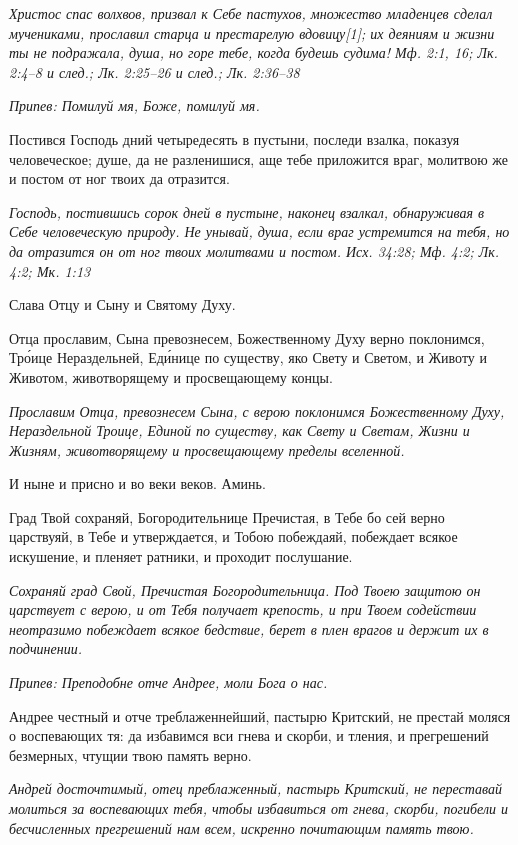 \itshape Христос спас волхвов, призвал к Себе пастухов, множество младенцев сделал мучениками, прославил старца и престарелую вдовицу[1]; их деяниям и жизни ты не подражала, душа, но горе тебе, когда будешь судима! Мф. 2:1, 16; Лк. 2:4–8 и след.; Лк. 2:25–26 и след.; Лк. 2:36–38\normalfont{}


\itshape Припев:\normalfont{} Помилуй мя, Боже, помилуй мя.


Постився Господь дний четыредесять в пустыни, последи взалка, показуя человеческое; душе, да не разленишися, аще тебе приложится враг, молитвою же и постом от ног твоих да отразится.


\itshape Господь, постившись сорок дней в пустыне, наконец взалкал, обнаруживая в Себе человеческую природу. Не унывай, душа, если враг устремится на тебя, но да отразится он от ног твоих молитвами и постом. Исх. 34:28; Мф. 4:2; Лк. 4:2; Мк. 1:13\normalfont{}


Слава Отцу и Сыну и Святому Духу.


Отца прославим, Сына превознесем, Божественному Духу верно поклонимся, Тро́ице Нераздельней, Еди́нице по существу, яко Свету и Светом, и Животу и Животом, животворящему и просвещающему концы.


\itshape Прославим Отца, превознесем Сына, с верою поклонимся Божественному Духу, Нераздельной Троице, Единой по существу, как Свету и Светам, Жизни и Жизням, животворящему и просвещающему пределы вселенной.\normalfont{}


И ныне и присно и во веки веков. Аминь.


Град Твой сохраняй, Богородительнице Пречистая, в Тебе бо сей верно царствуяй, в Тебе и утверждается, и Тобою побеждаяй, побеждает всякое искушение, и пленяет ратники, и проходит послушание.


\itshape Сохраняй град Свой, Пречистая Богородительница. Под Твоею защитою он царствует с верою, и от Тебя получает крепость, и при Твоем содействии неотразимо побеждает всякое бедствие, берет в плен врагов и держит их в подчинении.\normalfont{}


\itshape Припев:\normalfont{} Преподобне отче Андрее, моли Бога о нас.


Андрее честный и отче треблаженнейший, пастырю Критский, не престай моляся о воспевающих тя: да избавимся вси гнева и скорби, и тления, и прегрешений безмерных, чтущии твою память верно.


\itshape Андрей досточтимый, отец преблаженный, пастырь Критский, не переставай молиться за воспевающих тебя, чтобы избавиться от гнева, скорби, погибели и бесчисленных прегрешений нам всем, искренно почитающим память твою.\normalfont{}



